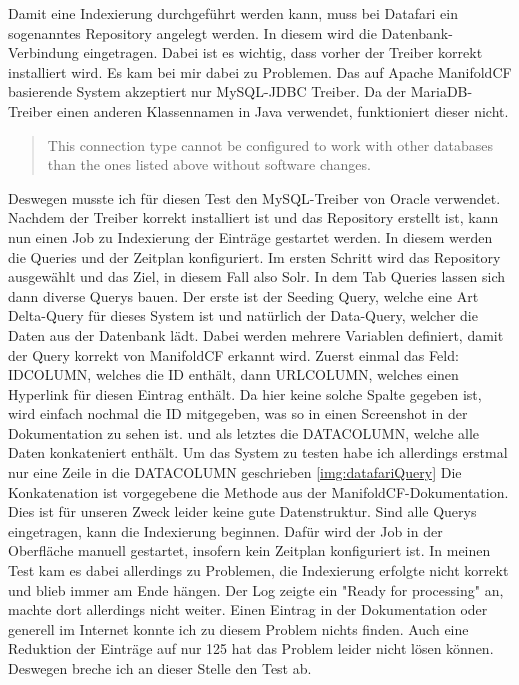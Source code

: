 Damit eine Indexierung durchgeführt werden kann, muss bei Datafari ein sogenanntes Repository angelegt werden. In diesem wird die Datenbank-Verbindung eingetragen. Dabei ist es wichtig, dass vorher der Treiber korrekt installiert wird. Es kam bei mir dabei zu Problemen. 
Das auf Apache ManifoldCF basierende System akzeptiert nur MySQL-JDBC Treiber. Da der MariaDB-Treiber einen anderen Klassennamen in Java verwendet, funktioniert dieser nicht. \begin{quote} This connection type cannot be configured to work with other databases than the ones listed above without software changes.~\cite[S.~61]{ApacheSoftwareFoundation.}\end{quote} Deswegen musste ich für diesen Test den MySQL-Treiber von Oracle verwendet.
Nachdem der Treiber korrekt installiert ist und das Repository erstellt ist, kann nun einen Job zu Indexierung der Einträge gestartet werden. In diesem werden die Queries und der Zeitplan konfiguriert.
Im ersten Schritt wird das Repository ausgewählt und das Ziel, in diesem Fall also Solr. In dem Tab Queries lassen sich dann diverse Querys bauen. Der erste ist der Seeding Query, welche eine Art Delta-Query für dieses System ist und natürlich der Data-Query, welcher die Daten aus der Datenbank lädt. Dabei werden mehrere Variablen definiert, damit der Query korrekt von ManifoldCF erkannt wird. Zuerst einmal das Feld: IDCOLUMN, welches die ID enthält, dann URLCOLUMN, welches einen Hyperlink für diesen Eintrag enthält. Da hier keine solche Spalte gegeben ist, wird einfach nochmal die ID mitgegeben, was so in einen Screenshot in der Dokumentation zu sehen ist. und als letztes die DATACOLUMN, welche alle Daten konkateniert enthält. Um das System zu testen habe ich allerdings erstmal nur eine Zeile in die DATACOLUMN geschrieben \ref{img:datafariQuery} Die Konkatenation ist vorgegebene die Methode aus der ManifoldCF-Dokumentation. \cite[S.~97]{ApacheSoftwareFoundation.} Dies ist für unseren Zweck leider keine gute Datenstruktur.
Sind alle Querys eingetragen, kann die Indexierung beginnen. Dafür wird der Job in der Oberfläche manuell gestartet, insofern kein Zeitplan konfiguriert ist. In meinen Test kam es dabei allerdings zu Problemen, die Indexierung erfolgte nicht korrekt und blieb immer am Ende hängen. Der Log zeigte ein "Ready for processing" an, machte dort allerdings nicht weiter. Einen Eintrag in der Dokumentation oder generell im Internet konnte ich zu diesem Problem nichts finden. Auch eine Reduktion der Einträge auf nur 125 hat das Problem leider nicht lösen können. Deswegen breche ich an dieser Stelle den Test ab. 

